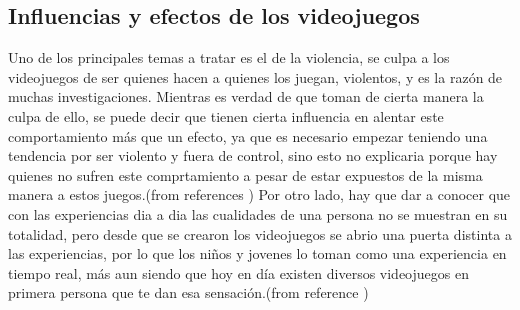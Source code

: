 \documentclass{bmcart}
\begin{document}
\subsection*{Influencias y efectos de los videojuegos}
Uno de los principales temas a tratar es el de la violencia, se culpa a los videojuegos de ser quienes hacen a quienes los juegan, violentos, y es la razón de muchas investigaciones. Mientras es verdad de que toman de cierta manera la culpa de ello, se puede decir que tienen cierta influencia en alentar este comportamiento más que un efecto, ya que es necesario empezar teniendo una tendencia por ser violento y fuera de control, sino esto no explicaria porque hay quienes no sufren este comprtamiento a pesar de estar expuestos de la misma manera a estos juegos.(from references \cite{juegoycine} \cite{juegosviolencia})
\newline
\newline
Por otro lado, hay que dar a conocer que con las experiencias dia a dia las cualidades de una persona no se muestran en su totalidad, pero desde que se crearon los videojuegos se abrio una puerta distinta a las experiencias, por lo que los niños y jovenes lo toman como una experiencia en tiempo real, más aun siendo que hoy en día existen diversos videojuegos en primera persona que te dan esa sensación.(from reference \cite{juegocuidado})
\end{document}
